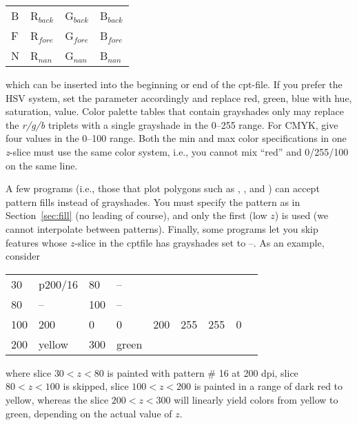 \begin{center}
\begin{tabular}{llll}
B &  R$_{back}$ &  G$_{back}$ &  B$_{back}$ \\ 
F &  R$_{fore}$ &  G$_{fore}$ &  B$_{fore}$ \\ 
N &  R$_{nan}$ &  G$_{nan}$ &  B$_{nan}$ \\
\end{tabular}
\end{center}

\noindent
which can be inserted into the beginning or end of the cpt-file.  If
you prefer the HSV system, set the
 parameter accordingly and replace red, green,
blue with hue, saturation, value.  Color palette tables that contain
grayshades only may replace the \emph{r/g/b} triplets with a single grayshade
in the 0--255 range.  For CMYK, give four values in the 0--100 range.
Both the min and max color specifications in one \emph{z}-slice must use
the same color system, i.e., you cannot mix ``red'' and 0/255/100 on the
same line.

A few programs (i.e., those that plot polygons such as ,
, and ) can accept pattern fills instead
of grayshades.  You must specify the pattern as in Section~\ref{sec:fill} (no
leading  of course), and only the first (low $z$) is used (we cannot
interpolate between patterns).  
Finally, some programs let you skip features
whose $z$-slice in the cptfile has grayshades set to --.  As an example,
consider

\begin{center}
\begin{tabular}{lllllllll}
30 &  p200/16 &  80 & -- \\ 
80 &  -- &  100 &  -- \\
100 &  200 &  0  &  0  &  200 &  255 &  255  &  0 \\
200 &  yellow &  300 & green  \\ 
\end{tabular} 
\end{center}
\noindent
where slice $30 < z < 80$ is painted with pattern \# 16 at 200 dpi,
slice $80 < z < 100$ is skipped, slice $100 < z < 200$ is
painted in a range of dark red to yellow, whereas the slice $200 < z < 300$
will linearly yield colors from yellow to green, depending on the actual value
of $z$.



